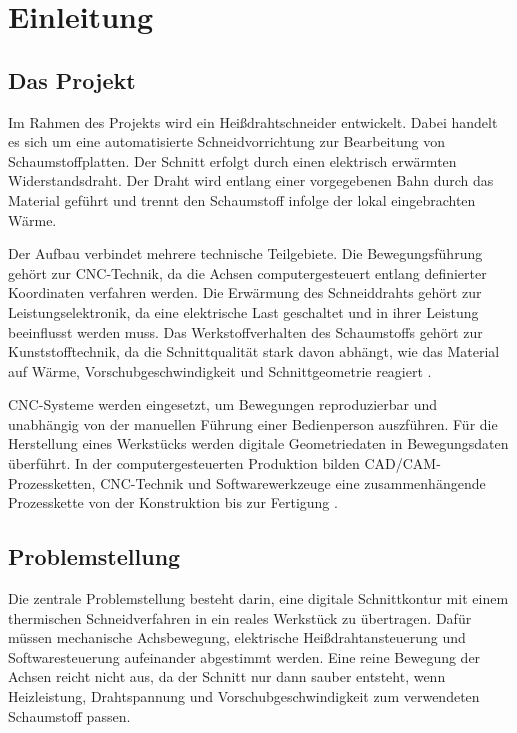 %
%

\chapter{Einleitung}

\section{Das Projekt}
\label{sec:einleitung_thema}

Im Rahmen des Projekts wird ein Heißdrahtschneider entwickelt. Dabei handelt es sich um eine automatisierte Schneidvorrichtung zur Bearbeitung von Schaumstoffplatten. Der Schnitt erfolgt durch einen elektrisch erwärmten Widerstandsdraht. Der Draht wird entlang einer vorgegebenen Bahn durch das Material geführt und trennt den Schaumstoff infolge der lokal eingebrachten Wärme.

Der Aufbau verbindet mehrere technische Teilgebiete. Die Bewegungsführung gehört zur CNC-Technik, da die Achsen computergesteuert entlang definierter Koordinaten verfahren werden. Die Erwärmung des Schneiddrahts gehört zur Leistungselektronik, da eine elektrische Last geschaltet und in ihrer Leistung beeinflusst werden muss. Das Werkstoffverhalten des Schaumstoffs gehört zur Kunststofftechnik, da die Schnittqualität stark davon abhängt, wie das Material auf Wärme, Vorschubgeschwindigkeit und Schnittgeometrie reagiert \cite{Bonnet:2025}.

CNC-Systeme werden eingesetzt, um Bewegungen reproduzierbar und unabhängig von der manuellen Führung einer Bedienperson auszführen. Für die Herstellung eines Werkstücks werden digitale Geometriedaten in Bewegungsdaten überführt. In der computergesteuerten Produktion bilden CAD/CAM-Prozessketten, CNC-Technik und Softwarewerkzeuge eine zusammenhängende Prozesskette von der Konstruktion bis zur Fertigung \cite{Hehenberger:2020}. 


\section{Problemstellung}
\label{sec:problemstellung}

Die zentrale Problemstellung besteht darin, eine digitale Schnittkontur mit einem thermischen Schneidverfahren in ein reales Werkstück zu übertragen. Dafür müssen mechanische Achsbewegung, elektrische Heißdrahtansteuerung und Softwaresteuerung aufeinander abgestimmt werden. Eine reine Bewegung der Achsen reicht nicht aus, da der Schnitt nur dann sauber entsteht, wenn Heizleistung, Drahtspannung und Vorschubgeschwindigkeit zum verwendeten Schaumstoff passen.

